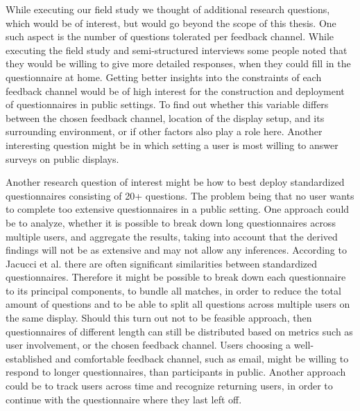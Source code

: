 
While executing our field study we thought of additional research questions, which would be of interest, but would go beyond the scope of this thesis. 
One such aspect is the number of questions tolerated per feedback channel. While executing the field study and semi-structured interviews some people noted that they would be willing to give more detailed responses, when they could fill in the questionnaire at home. Getting better insights into the constraints of each feedback channel would be of high interest for the construction and deployment of questionnaires in public settings. To find out whether this variable differs between the chosen feedback channel, location of the display setup, and its surrounding environment, or if other factors also play a role here. Another interesting question might be in which setting a user is most willing to answer surveys on public displays. 


Another research question of interest might be how to best deploy standardized questionnaires consisting of 20+ questions. The problem being that no user wants to complete too extensive questionnaires in a public setting. One approach could be to analyze, whether it is possible to break down long questionnaires across multiple users, and aggregate the results, taking into account that the derived findings will not be as extensive and may not allow any inferences. According to Jacucci et al. \cite{jacucci2010worldsofinformation} there are often significant similarities between standardized questionnaires. Therefore it might be possible to break down each questionnaire to its principal components, to bundle all matches, in order to reduce the total amount of questions and to be able to split all questions across multiple users on the same display. 
Should this turn out not to be feasible approach, then questionnaires of different length can still be distributed based on metrics such as user involvement, or the chosen feedback channel. Users choosing a well-established and comfortable feedback channel, such as email, might be willing to respond to longer questionnaires, than participants in public. Another approach could be to track users across time and recognize returning users, in order to continue with the questionnaire where they last left off.


